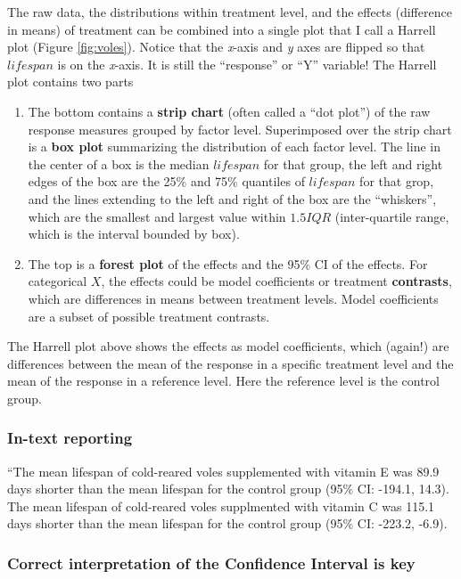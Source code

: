 \documentclass[]{book}
\providecommand{\tightlist}{%
  \setlength{\itemsep}{0pt}\setlength{\parskip}{0pt}}
\begin{document}
The raw data, the distributions within treatment level, and the effects
(difference in means) of treatment can be combined into a single plot
that I call a Harrell plot (Figure \ref{fig:voles}). Notice that the
\emph{x}-axis and \emph{y} axes are flipped so that \(lifespan\) is on
the \emph{x}-axis. It is still the ``response'' or ``Y'' variable! The
Harrell plot contains two parts

\begin{enumerate}
\def\labelenumi{\arabic{enumi}.}
\tightlist
\item
  The bottom contains a \textbf{strip chart} (often called a ``dot
  plot'') of the raw response measures grouped by factor level.
  Superimposed over the strip chart is a \textbf{box plot} summarizing
  the distribution of each factor level. The line in the center of a box
  is the median \(lifespan\) for that group, the left and right edges of
  the box are the 25\% and 75\% quantiles of \(lifespan\) for that grop,
  and the lines extending to the left and right of the box are the
  ``whiskers'', which are the smallest and largest value within
  \(1.5 IQR\) (inter-quartile range, which is the interval bounded by
  box).
\item
  The top is a \textbf{forest plot} of the effects and the 95\% CI of
  the effects. For categorical \(X\), the effects could be model
  coefficients or treatment \textbf{contrasts}, which are differences in
  means between treatment levels. Model coefficients are a subset of
  possible treatment contrasts.
\end{enumerate}

The Harrell plot above shows the effects as model coefficients, which
(again!) are differences between the mean of the response in a specific
treatment level and the mean of the response in a reference level. Here
the reference level is the control group.

\subsubsection{In-text reporting}\label{in-text-reporting}

``The mean lifespan of cold-reared voles supplemented with vitamin E was
89.9 days shorter than the mean lifespan for the control group (95\% CI:
-194.1, 14.3). The mean lifespan of cold-reared voles supplmented with
vitamin C was 115.1 days shorter than the mean lifespan for the control
group (95\% CI: -223.2, -6.9).

\subsubsection{Correct interpretation of the Confidence Interval is
key}\label{correct-interpretation-of-the-confidence-interval-is-key}
\end{document}
